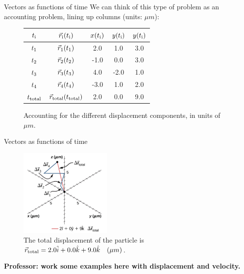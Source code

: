\documentclass{beamer}
\begin{document}
\begin{frame}{Vectors as functions of time}
We can think of this type of problem as an accounting problem, lining up columns (units: $\mu m$):
\begin{figure}
\begin{tabular}{| c | c | c | c | c |}
\hline
$t_{\rm i}$ & $\vec{r}_{\rm i}(t_{\rm i})$ & $x(t_{\rm i})$ & $y(t_{\rm i})$ & $y(t_{\rm i})$ \\
\hline
$t_{\rm 1}$ & $\vec{r}_{\rm 1}(t_{\rm 1})$ & 2.0 & 1.0 & 3.0 \\
\hline
$t_{\rm 2}$ & $\vec{r}_{\rm 2}(t_{\rm 2})$ & -1.0 & 0.0 & 3.0 \\
\hline
$t_{\rm 3}$ & $\vec{r}_{\rm 3}(t_{\rm 3})$ & 4.0 & -2.0 & 1.0 \\
\hline
$t_{\rm 4}$ & $\vec{r}_{\rm 4}(t_{\rm 4})$ & -3.0 & 1.0 & 2.0 \\
\hline
\hline
$t_{\rm total}$ & $\vec{r}_{\rm total}(t_{\rm total})$ & 2.0 & 0.0 & 9.0 \\
\hline
\end{tabular}
\caption{\label{tab:account} Accounting for the different displacement components, in units of $\mu m$.}
\end{figure}
\end{frame}

\begin{frame}{Vectors as functions of time}
\begin{figure}
\centering
\includegraphics[width=0.4\textwidth]{figures/Brownian.png}
\caption{\label{fig:brown2} The total displacement of the particle is $\vec{r}_{\rm total} = 2.0\hat{i} + 0.0\hat{k} + 9.0\hat{k}\quad (\mu m)$.}
\end{figure}
\textbf{Professor: work some examples here with displacement and velocity.}
\end{frame}
\end{document}
